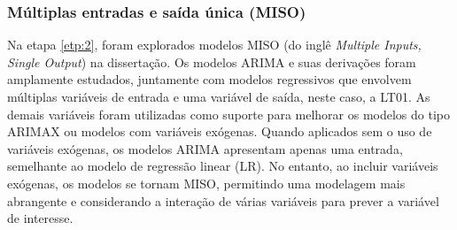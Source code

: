 \subsubsection{M\'ultiplas entradas e sa\'ida \'unica (MISO)}

Na etapa \ref{etp:2}, foram explorados modelos MISO (do inglê \textit{Multiple Inputs, Single Output}) na dissertação. Os modelos ARIMA e suas derivações foram amplamente estudados, juntamente com modelos regressivos que envolvem múltiplas variáveis de entrada e uma variável de saída, neste caso, a LT01. As demais variáveis foram utilizadas como suporte para melhorar os modelos do tipo ARIMAX ou modelos com variáveis exógenas. Quando aplicados sem o uso de variáveis exógenas, os modelos ARIMA apresentam apenas uma entrada, semelhante ao modelo de regressão linear (LR). No entanto, ao incluir variáveis exógenas, os modelos se tornam MISO, permitindo uma modelagem mais abrangente e considerando a interação de várias variáveis para prever a variável de interesse.